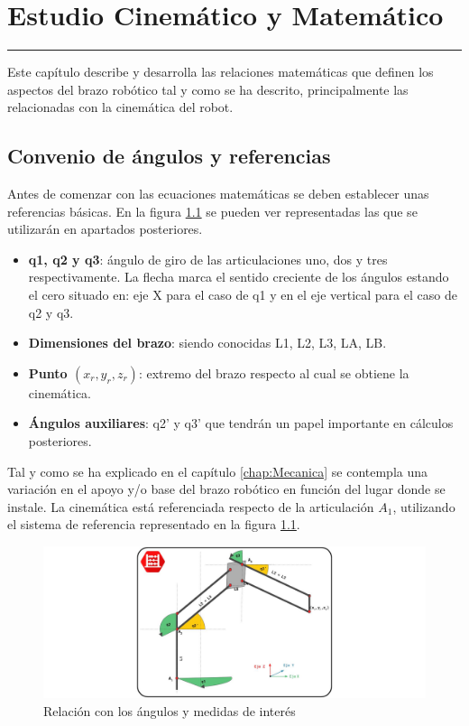 \chapter{Estudio Cinemático y Matemático} \label{chap:Cinematica}
\hrule
\vspace{3mm}

Este capítulo describe y desarrolla las relaciones matemáticas que definen los aspectos del brazo robótico tal y como se ha descrito, principalmente las relacionadas con la cinemática del robot.

\section{Convenio de ángulos y referencias}

	Antes de comenzar con las ecuaciones matemáticas se deben establecer unas referencias básicas. En la figura \ref{fig:Control:cinematica_3} se pueden ver representadas las que se utilizarán en apartados posteriores.
	
	\begin{itemize}
		\item \textbf{q1, q2 y q3}: ángulo de giro de las articulaciones uno, dos y tres respectivamente. La flecha marca el sentido creciente de los ángulos estando el cero situado en: eje X para el caso de q1 y en el eje vertical para el caso de q2 y q3.
		\item \textbf{Dimensiones del brazo}: siendo conocidas L1, L2, L3, LA, LB.
		\item \textbf{Punto $(x_r,y_r,z_r)$}: extremo del brazo respecto al cual se obtiene la cinemática.
		\item \textbf{Ángulos auxiliares}: q2' y q3' que tendrán un papel importante en cálculos posteriores.
	\end{itemize}
	
	Tal y como se ha explicado en el capítulo \ref{chap:Mecanica} se contempla una variación en el apoyo y/o base del brazo robótico en función del lugar donde se instale. La cinemática está referenciada respecto de la articulación $A_1$, utilizando el sistema de referencia representado en la figura \ref{fig:Control:cinematica_3}.
	
    \begin{figure}[H]
    	\centering
    	\includegraphics[width=1\textwidth]{figuras/Imagenes_cinematica/cinematica_3.jpg}
    	\caption{Relación con los ángulos y medidas de interés}
    	\label{fig:Control:cinematica_3}
    \end{figure}
    
